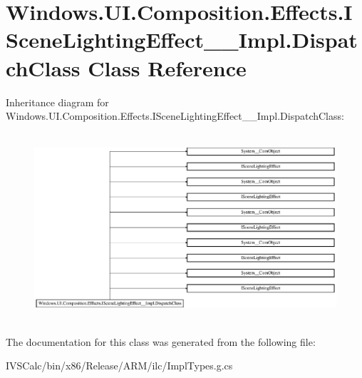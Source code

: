\hypertarget{class_windows_1_1_u_i_1_1_composition_1_1_effects_1_1_i_scene_lighting_effect_____impl_1_1_dispatch_class}{}\section{Windows.\+U\+I.\+Composition.\+Effects.\+I\+Scene\+Lighting\+Effect\+\_\+\+\_\+\+Impl.\+Dispatch\+Class Class Reference}
\label{class_windows_1_1_u_i_1_1_composition_1_1_effects_1_1_i_scene_lighting_effect_____impl_1_1_dispatch_class}
Inheritance diagram for Windows.\+U\+I.\+Composition.\+Effects.\+I\+Scene\+Lighting\+Effect\+\_\+\+\_\+\+Impl.\+Dispatch\+Class\+:\begin{figure}[H]
\begin{center}
\leavevmode
\includegraphics[height=7.000000cm]{class_windows_1_1_u_i_1_1_composition_1_1_effects_1_1_i_scene_lighting_effect_____impl_1_1_dispatch_class}
\end{center}
\end{figure}


The documentation for this class was generated from the following file\+:\begin{DoxyCompactItemize}
\item 
I\+V\+S\+Calc/bin/x86/\+Release/\+A\+R\+M/ilc/Impl\+Types.\+g.\+cs\end{DoxyCompactItemize}
